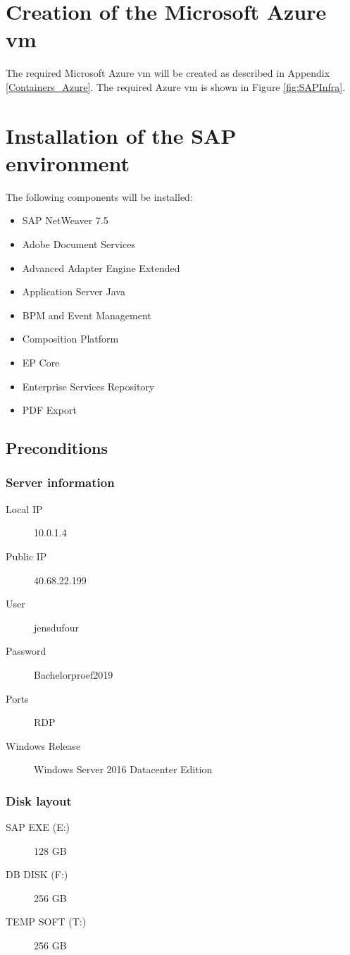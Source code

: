 \label{SAPConfig}
\section{Creation of the Microsoft Azure \acrshort{vm}}
The required Microsoft Azure \acrshort{vm} will be created as described in Appendix \ref{Containers_Azure}. 
The required Azure \acrshort{vm} is shown in Figure \ref{fig:SAPInfra}.

\section{Installation of the SAP environment}
The following components will be installed:

\begin{itemize}
    \item SAP NetWeaver 7.5
    \item Adobe Document Services
    \item Advanced Adapter Engine Extended
    \item Application Server Java
    \item BPM and Event Management
    \item Composition Platform
    \item EP Core
    \item Enterprise Services Repository
    \item PDF Export 
\end{itemize}

\subsection{Preconditions}
\subsubsection{Server information}
\begin{description}
    \item[Local IP] 10.0.1.4
    \item[Public IP] 40.68.22.199
    \item[User] jensdufour
    \item[Password] Bachelorproef2019
    \item[Ports] RDP
    \item[Windows Release] Windows Server 2016 Datacenter Edition
\end{description}   

\subsubsection{Disk layout}
\begin{description}
    \item[SAP EXE (E:)] 128 GB
    \item[DB DISK (F:)] 256 GB
    \item[TEMP SOFT (T:)] 256 GB
\end{description}

